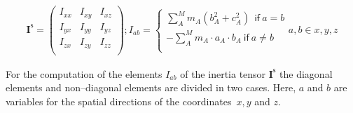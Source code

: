 	\begin{align}
		\textbf{I}^\mathsf{s} = \left(\begin{matrix}
						I_{xx} & I_{xy} & I_{xz} \\
						I_{yx} & I_{yy} & I_{yz} \\
						I_{zx} & I_{zy} & I_{zz} \\ 
				   	\end{matrix} \right) 
			 ; I_{ab} = \begin{cases}
				\sum_{A}^{M} m_A ( b_A^2 + c_A^2 ) ~~\mathsf{if}~ a = b\\
			   	 - \sum_{A}^{M} m_A \cdot a_A \cdot b_A  ~\mathsf{if}~ a \neq b \\
			   	\end{cases} a,b \in x,y,z
		\label{eq:MomentOfInertia}
	\end{align}
	
	For the computation of the elements $I_{ab}$ of the inertia tensor $\textbf{I}^\mathsf{s}$ the diagonal
	elements and non--diagonal elements are divided in two cases.
	Here, $a$ and $b$ are variables for the spatial directions of the coordinates~$x,y$ and $z$.\\

